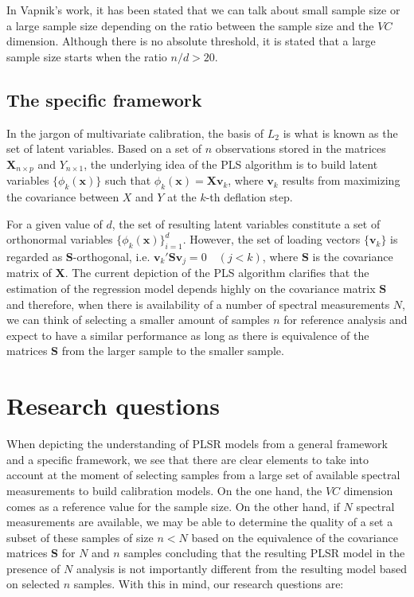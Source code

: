 \documentclass{article}
\begin{document}
In Vapnik's work, it has been stated that we can talk about small sample size or a large sample size depending on the ratio between the sample size and the $VC$ dimension. Although there is no absolute threshold, it is stated that a large sample size starts when the ratio $n/d>20$.


\subsection*{The specific framework}

In the jargon of multivariate calibration, the basis of $L_2$ is what is known as the set of latent variables. Based on a set of $n$ observations stored in the matrices $\mathbf{X}_{n\times p}$ and $Y_{n\times 1}$, the underlying idea of the PLS algorithm is to build latent variables $\{\phi_{k}(\mathbf{x})\}$ such that $\phi_k(\mathbf{x}) = \mathbf{Xv}_{k}$, where $\mathbf{v}_k$ results from maximizing the covariance between $X$ and $Y$ at the $k$-th deflation step. 

For a given value of $d$, the set of resulting latent variables constitute a set of orthonormal variables $\{\phi_{k}(\mathbf{x})\}_{i=1}^d$. However, the set of loading vectors $\{\mathbf{v}_k\}$ is regarded as $\mathbf{S}$-orthogonal, i.e. $\mathbf{v}_k'\mathbf{S}\mathbf{v}_j = 0 \quad (j<k)$, where $\mathbf{S}$ is the covariance matrix of $\mathbf{X}$. The current depiction of the PLS algorithm clarifies that the estimation of the regression model depends highly on the covariance matrix $\mathbf{S}$ and therefore, when there is availability of a number of spectral measurements $N$, we can think of selecting a smaller amount of samples $n$ for reference analysis and expect to have a similar performance as long as there is equivalence of the matrices $\mathbf{S}$ from the larger sample to the smaller sample. 


\section*{Research questions}

When depicting the understanding of PLSR models from a general framework and a specific framework, we see that there are clear elements to take into account at the moment of selecting samples from a large set of available spectral measurements to build calibration models. On the one hand, the $VC$ dimension comes as a reference value for the sample size. On the other hand, if $N$ spectral measurements are available, we may be able to determine the quality of a set a subset of these samples of size $n<N$ based on the equivalence of the covariance matrices $\mathbf{S}$ for $N$ and $n$ samples concluding that the resulting PLSR model in the presence of $N$ analysis is not importantly different from the resulting model based on selected $n$ samples. With this in mind, our research questions are:
\end{document}
